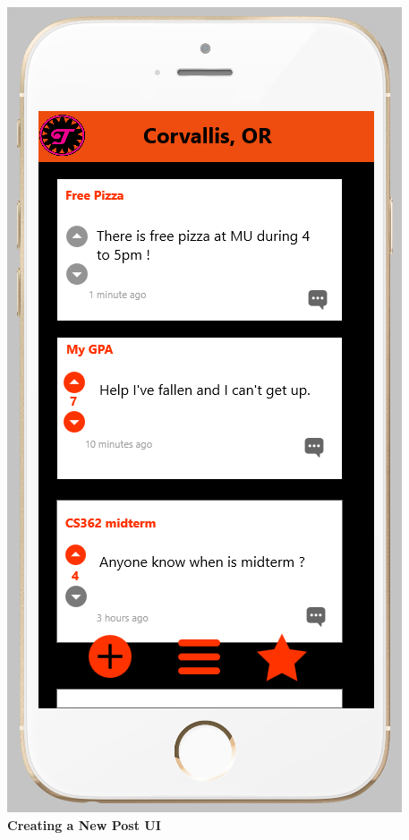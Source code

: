 \documentclass[12pt]{article}
\begin{document}
\begin{center}
\includegraphics[scale=0.30]{img/ui/post-review}\linebreak
\textbf{Creating a New Post UI}
  \end{center}
\end{document}
